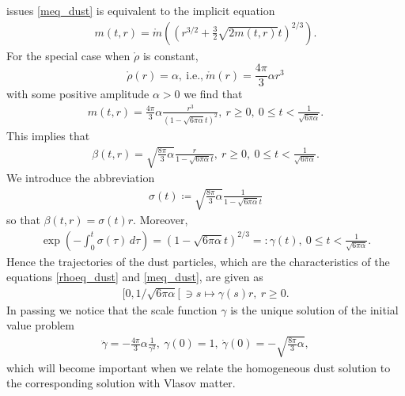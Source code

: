 \documentclass[11pt]{article}
\begin{document}
issues \eqref{meq_dust} is equivalent to the implicit equation
\begin{align}\label{impl_meq_dust}
  m(t,r)
  = \mathring{m}
  \left(\left(r^{3/2} + \frac{3}{2} \sqrt{2 m(t,r)} t\right)^{2/3}\right).
\end{align}
For the special case when $\mathring{\rho}$ is constant,
\[
\mathring{\rho}(r) = \alpha,\ \mbox{i.e.,}\
\mathring{m}(r) = \frac{4\pi}{3} \alpha r^3
\]
with some positive amplitude $\alpha >0$ we find that
\begin{align}\label{m_dust}
  m(t,r) = \frac{4\pi}{3} \alpha \frac{r^3}{(1-\sqrt{6\pi \alpha} t)^{2}},\
  r\geq 0,\ 0\leq t < \frac{1}{\sqrt{6\pi \alpha}}.
\end{align}
This implies that
\begin{align}\label{beta_dust}
  \beta(t,r) = \sqrt{\frac{8\pi}{3} \alpha}
  \frac{r}{1-\sqrt{6\pi \alpha} t},\
  r\geq 0,\ 0\leq t < \frac{1}{\sqrt{6\pi \alpha}}.
\end{align}
We introduce the abbreviation
\begin{align}\label{sigma_dust}
  \sigma(t) \coloneqq
  \sqrt{\frac{8\pi}{3} \alpha} \frac{1}{1-\sqrt{6\pi \alpha} t}
\end{align}
so that $\beta(t,r)=\sigma(t) r$. Moreover,
\begin{align}\label{gamma_dust}
  \exp\left(-\int_0^t \sigma (\tau)\, d\tau\right)
  = (1-\sqrt{6\pi \alpha} t)^{2/3} =: \gamma(t),\
  0\leq t < \frac{1}{\sqrt{6\pi \alpha}}.
\end{align}
Hence the trajectories of the dust particles, which are
the characteristics of the equations \eqref{rhoeq_dust} and \eqref{meq_dust},
are given as
\begin{align}\label{dustpart}
  [0,1/\sqrt{6\pi \alpha}[\, \ni s \mapsto \gamma(s) r,\
  r\geq 0.
\end{align}
In passing we notice that the scale function $\gamma$
is the unique solution of the initial value problem
\begin{align}\label{gammaeq_dust}
  \ddot \gamma = - \frac{4\pi}{3} \alpha \frac{1}{\gamma^2},\
  \gamma(0)=1,\ \dot \gamma(0) = - \sqrt{\frac{8\pi}{3} \alpha},
\end{align}
which will become important when we relate the homogeneous dust
solution to the corresponding solution with Vlasov matter.
\end{document}
